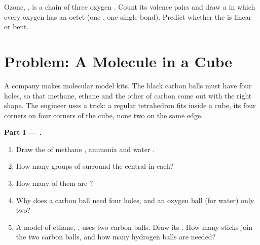 \begin{exercise}[$\star\star\star$]\label{exo:g10:lewis-and-shape:15}
Ozone, , is a chain of three oxygen . Count its valence pairs
and draw a  in which every oxygen has an octet (one
, one single bond). Predict whether the  is linear or
bent.
\end{exercise}

\section{Problem: A Molecule in a Cube}

\begin{problem}
\label{pb:g10:lewis-and-shape:1}
A company makes molecular model kits. The black carbon balls must have
four holes, so that methane, ethane and the other  of carbon come
out with the right shape. The engineer uses a trick: a regular
tetrahedron fits inside a cube, its four corners on four corners of the
cube, none two on the same edge.

\medskip
\noindent\textbf{Part I --- .}
\begin{enumerate}
  \item Draw the  of methane , ammonia  and
        water .
  \item How many groups of  surround the central  in each?
  \item How many of them are ?
  \item Why does a carbon ball need four holes, and an oxygen ball (for
        water) only two?
  \item A model of ethane, , uses two carbon balls. Draw its . How many sticks join the two carbon balls, and how many
        hydrogen balls are needed?
\end{enumerate}


\end{problem}
